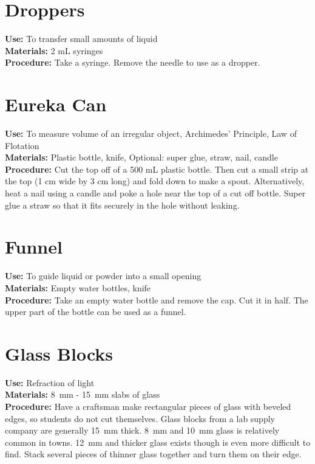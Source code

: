 \section{Droppers}
\vspace{-10pt}
\textbf{Use:} To transfer small amounts of liquid \\
\textbf{Materials:} 2 mL syringes\\
\textbf{Procedure:} Take a syringe. Remove the needle to use as a dropper. 

\section{Eureka Can}
\vspace{-10pt}
\textbf{Use:} To measure volume of an irregular object, Archimedes' Principle, Law of Flotation\\
\textbf{Materials:} Plastic bottle, knife, Optional: super glue, straw, nail, candle\\
\textbf{Procedure:} Cut the top off of a 500 mL plastic bottle. Then cut a small strip at the top (1 cm wide by 3 cm long) and fold down to make a spout. Alternatively, heat a nail using a candle and poke a hole near the top of a cut off bottle. Super glue a straw so that it fits securely in the hole without leaking.

\section{Funnel}
\vspace{-10pt}
\textbf{Use:} To guide liquid or powder into a small opening\\
\textbf{Materials:} Empty water bottles, knife\\
\textbf{Procedure:} Take an empty water bottle and remove the cap. Cut it in half. The upper part of the bottle can be used as a funnel.  

\section{Glass Blocks}
\vspace{-10pt}
\textbf{Use:} Refraction of light\\
\textbf{Materials:} 8~mm - 15~mm slabs of glass\\
\textbf{Procedure:} Have a craftsman make rectangular pieces of glass with beveled edges, so students do not cut themselves. Glass blocks from a lab supply company are generally 15~mm thick. 8~mm and 10~mm glass is relatively common in towns. 12~mm and thicker glass exists though is even more difficult to find. 
Stack several pieces of thinner glass together and turn them on their edge.

